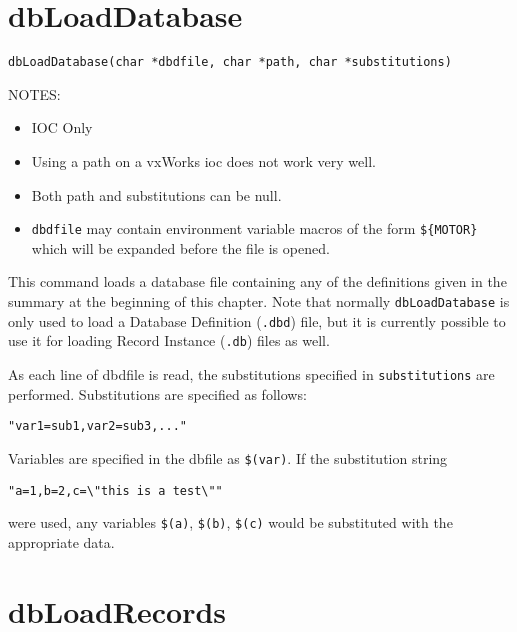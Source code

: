 \section{dbLoadDatabase}

\begin{verbatim}
dbLoadDatabase(char *dbdfile, char *path, char *substitutions)
\end{verbatim}

NOTES: 

\begin{itemize}
\item IOC Only

\item Using a path on a vxWorks ioc does not work very well.

\item Both path and substitutions can be null.

\item \verb|dbdfile| may contain environment variable macros of the form \verb|${MOTOR}| which will be expanded before the 
file is opened.

\end{itemize}

This command loads a database file containing any of the definitions given in the summary at the beginning of this 
chapter. Note that normally \verb|dbLoadDatabase| is only used to load a Database Definition (\verb|.dbd|) file, but it is currently 
possible to use it for loading Record Instance (\verb|.db|) files as well.

As each line of dbdfile is read, the substitutions specified in \verb|substitutions| are performed. Substitutions are specified as follows:

\begin{verbatim}
"var1=sub1,var2=sub3,..."
\end{verbatim}

Variables are specified in the dbfile as \verb|$(var)|. If the substitution string

\begin{verbatim}
"a=1,b=2,c=\"this is a test\""
\end{verbatim}

were used, any variables \verb|$(a)|, \verb|$(b)|, \verb|$(c)| would be substituted with the appropriate data.

\section{dbLoadRecords}

